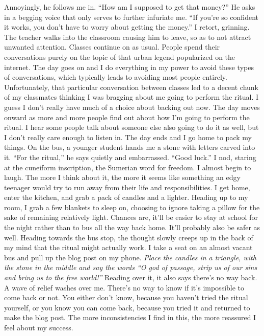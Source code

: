 \documentclass[a4paper, 12pt]{book}
\newcommand\tab[1][1cm]{\hspace*{#1}}
\begin{document}
\tab
Annoyingly, he follows me in. ``How am I supposed to get that money?'' He asks in a begging voice that only serves to further infuriate me.
\newline
\tab
``If you’re so confident it works, you don’t have to worry about getting the money.'' I retort, grinning. The teacher walks into the classroom causing him to leave, so as to not attract unwanted attention. 
\newline
\tab
Classes continue on as usual. People spend their conversations purely on the topic of that urban legend popularized on the internet. The day goes on and I do everything in my power to avoid these types of conversations, which typically leads to avoiding most people entirely. Unfortunately, that particular conversation between classes led to a decent chunk of my classmates thinking I was bragging about me going to perform the ritual. I guess I don’t really have much of a choice about backing out now.
\newline
\tab
The day moves onward as more and more people find out about how I’m going to perform the ritual. I hear some people talk about someone else also going to do it as well, but I don’t really care enough to listen in. The day ends and I go home to pack my things. On the bus, a younger student hands me a stone with letters carved into it. ``For the ritual,'' he says quietly and embarrassed. ``Good luck.'' I nod, staring at the cuneiform inscription, \textcuneiform{\AmaGi} the Sumerian word for freedom. I almost begin to laugh. The more I think about it, the more it seems like something an edgy teenager would try to run away from their life and responsibilities.
\newline
\tab
I get home, enter the kitchen, and grab a pack of candles and a lighter. Heading up to my room, I grab a few blankets to sleep on, choosing to ignore taking a pillow for the sake of remaining relatively light. Chances are, it’ll be easier to stay at school for the night rather than to bus all the way back home. It’ll probably also be safer as well. Heading towards the bus stop, the thought slowly creeps up in the back of my mind that the ritual might actually work. I take a seat on an almost vacant bus and pull up the blog post on my phone. 
\newline
\tab
\textit{
Place the candles in a triangle, with the stone in the middle and say the words ``O god of passage, strip us of our sins and bring us to the free world!'' 
}
\newline
\tab
Reading over it, it also says there’s no way back. A wave of relief washes over me. There’s no way to know if it’s impossible to come back or not. You either don’t know, because you haven’t tried the ritual yourself, or you know you can come back, because you tried it and returned to make the blog post. The more inconsistencies I find in this, the more reassured I feel about my success.
\end{document}
